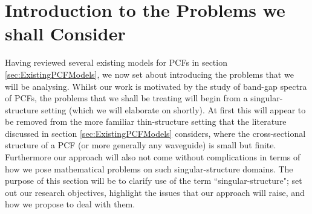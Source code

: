 \section{Introduction to the Problems we shall Consider} \label{sec:OurPhysicalSetup}
Having reviewed several existing models for PCFs in section \ref{sec:ExistingPCFModels}, we now set about introducing the problems that we will be analysing.
Whilst our work is motivated by the study of band-gap spectra of PCFs, the problems that we shall be treating will begin from a singular-structure setting (which we will elaborate on shortly).
At first this will appear to be removed from the more familiar thin-structure setting that the literature discussed in section \ref{sec:ExistingPCFModels} considers, where the cross-sectional structure of a PCF (or more generally any waveguide) is small but finite.
Furthermore our approach will also not come without complications in terms of how we pose mathematical problems on such singular-structure domains.
The purpose of this section will be to clarify use of the term ``singular-structure"; set out our research objectives, highlight the issues that our approach will raise, and how we propose to deal with them. \newline

